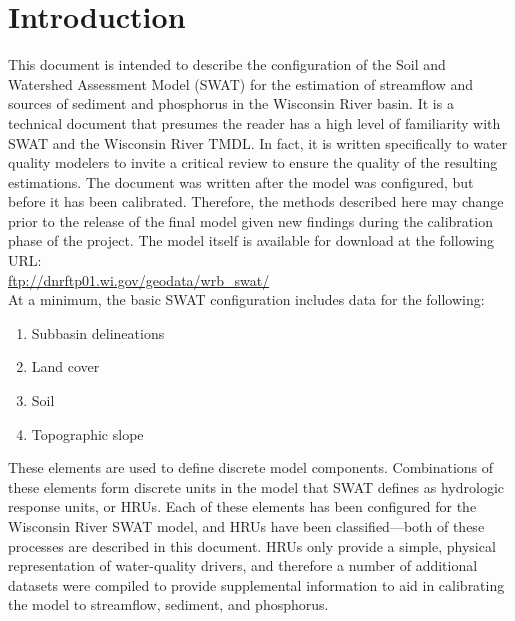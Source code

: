 \section{Introduction}
This document is intended to describe the configuration of the Soil and
Watershed Assessment Model (SWAT) for the estimation of streamflow and sources
of sediment and phosphorus in the Wisconsin River basin. It is a technical
document that presumes the reader has a high level of familiarity with SWAT and
the Wisconsin River TMDL. In fact, it is written specifically to water quality
modelers to invite a critical review to ensure the quality of the resulting
estimations. The document was written after the model was configured, but before
it has been calibrated. Therefore, the methods described here may change prior
to the release of the final model given new findings during the calibration
phase of the project. The model itself is available for download at the following URL: \\

\url{ftp://dnrftp01.wi.gov/geodata/wrb_swat/} \\

At a minimum, the basic SWAT configuration includes data for the following:

\begin{enumerate}
	\item Subbasin delineations
	\item Land cover
	\item Soil
	\item Topographic slope
\end{enumerate}

These elements are used to define discrete model components. Combinations of
these elements form discrete units in the model that SWAT defines as hydrologic
response units, or HRUs. Each of these elements has been configured for the
Wisconsin River SWAT model, and HRUs have been classified---both of these
processes are described in this document. HRUs only provide a simple, physical
representation of water-quality drivers, and therefore a number of additional
datasets were compiled to provide supplemental information to aid in calibrating
the model to streamflow, sediment, and phosphorus.

